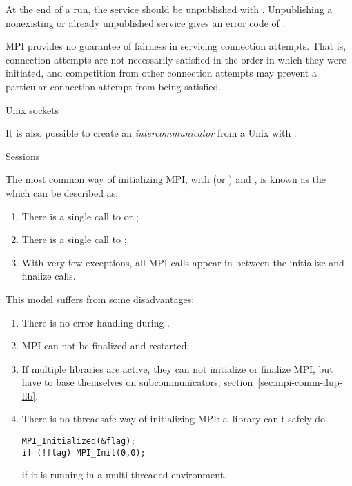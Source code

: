 At the end of a run, the service should be unpublished with
.
Unpublishing a nonexisting or already unpublished service gives an
error code of .

MPI provides no guarantee of fairness in servicing connection
attempts. That is, connection attempts are not necessarily satisfied
in the order in which they were initiated, and competition from other
connection attempts may prevent a particular connection attempt from
being satisfied.

 {Unix sockets}

It is also possible to create an
\emph{intercommunicator} from a Unix
with
.

 {Sessions}
\label{sec:session}

The most common way of initializing MPI,
with  (or ) and ,
is known as the  which can be described as:
\begin{enumerate}
\item There is a single call to  or ;
\item There is a single call to ;
\item With very few exceptions, all MPI calls appear in between the initialize and finalize calls.
\end{enumerate}

This model suffers from some disadvantages:
\begin{enumerate}
\item There is no error handling during .
\item MPI can not be finalized and restarted;
\item If multiple libraries are active, they can not initialize
  or finalize MPI, but have to base themselves on subcommunicators;
  section~\ref{sec:mpi-comm-dup-lib}.
\item There is no threadsafe way of initializing MPI:
  a~library can't safely do
\begin{lstlisting}
MPI_Initialized(&flag);
if (!flag) MPI_Init(0,0);
\end{lstlisting}
if it is running in a multi-threaded environment.
\end{enumerate}

